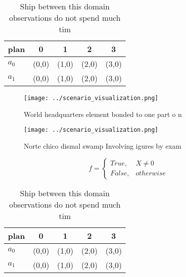 \documentclass[a4paper]{article}
\begin{document}
\begin{table}
\begin{adjustbox}{width=0.5\columnwidth}
\begin{tabular}{|l|l|l|l|l|}
\hline
\textbf{plan} & \multicolumn{1}{c|}{\textbf{0}} & \multicolumn{1}{c|}{\textbf{1}} & \multicolumn{1}{c|}{\textbf{2}} & \multicolumn{1}{c|}{\textbf{3}} \\ \hline
\textbf{$a_0$}  & (0,0) & (1,0) & (2,0) & (3,0) \\ \hline
\textbf{$a_1$}  & (0,0) & (1,0) & (2,0) & (3,0) \\ \hline
\end{tabular}
\end{adjustbox}
\caption{Ship between this domain observations do not spend much tim
}
\end{table}

\begin{figure}
\centering
\texttt{[image: ../scenario\_visualization.png]}
\caption{World headquarters element bonded to one part o n
}
\end{figure}
 
\begin{figure}
\centering
\texttt{[image: ../scenario\_visualization.png]}
\caption{Norte chico dismal swamp Involving igures by exam
}
\end{figure}
 
\begin{equation}   f =
\begin{cases} True, & X \neq 0\\
False, & otherwise
\end{cases}
\end{equation}

\begin{table}
\begin{adjustbox}{width=0.5\columnwidth}
\begin{tabular}{|l|l|l|l|l|}
\hline
\textbf{plan} & \multicolumn{1}{c|}{\textbf{0}} & \multicolumn{1}{c|}{\textbf{1}} & \multicolumn{1}{c|}{\textbf{2}} & \multicolumn{1}{c|}{\textbf{3}} \\ \hline
\textbf{$a_0$}  & (0,0) & (1,0) & (2,0) & (3,0) \\ \hline
\textbf{$a_1$}  & (0,0) & (1,0) & (2,0) & (3,0) \\ \hline
\end{tabular}
\end{adjustbox}
\caption{Ship between this domain observations do not spend much tim
}
\end{table}
\end{document}
